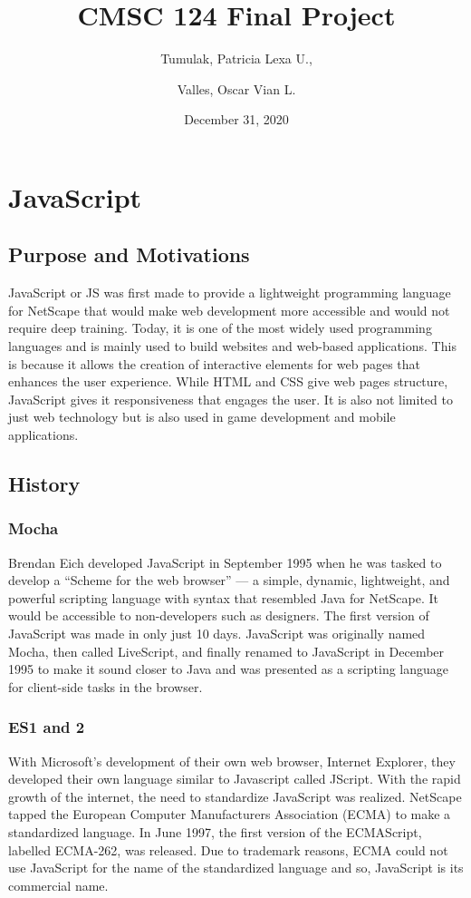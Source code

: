 \documentclass{article}
\title{CMSC 124 Final Project}
\date{December 31, 2020}
\author{Tumulak, Patricia Lexa U., \\\and{} Valles, Oscar Vian L.}
\begin{document}
\maketitle
\newpage
\tableofcontents
\newpage
{}

\section{JavaScript}
\subsection{Purpose and Motivations}
JavaScript or JS was first made to provide a lightweight programming language
for NetScape that would make web development more accessible and would not
require deep training. Today, it is one of the most widely used
programming languages and is mainly used to build websites and web-based
applications. This is because it allows the creation of interactive elements for
web pages that enhances the user experience. While HTML and CSS give web pages
structure, JavaScript gives it responsiveness that engages the user. It is also
not limited to just web technology but is also used in game development and
mobile applications.

\subsection{History}

    \subsubsection{Mocha}
    Brendan Eich developed JavaScript in September 1995 when he was
    tasked to develop a “Scheme for the web browser” --- a simple, dynamic,
    lightweight, and powerful scripting language with syntax that resembled Java
    for NetScape. It would be accessible to non-developers such as designers.
    The first version of JavaScript was made in only just 10 days. JavaScript
    was originally named Mocha, then called LiveScript, and finally renamed to
    JavaScript in December 1995 to make it sound closer to Java and was
    presented as a scripting language for client-side tasks in the browser.

    \subsubsection{ES1 and 2}
    With Microsoft’s development of their own web browser, Internet Explorer,
    they developed their own language similar to Javascript called JScript. With
    the rapid growth of the internet, the need to standardize JavaScript was
    realized. NetScape tapped the European Computer Manufacturers Association
    (ECMA) to make a standardized language. In June 1997, the first version of
    the ECMAScript, labelled ECMA-262, was released. Due to trademark reasons,
    ECMA could not use JavaScript for the name of the standardized language and
    so, JavaScript is its commercial name.
\end{document}
